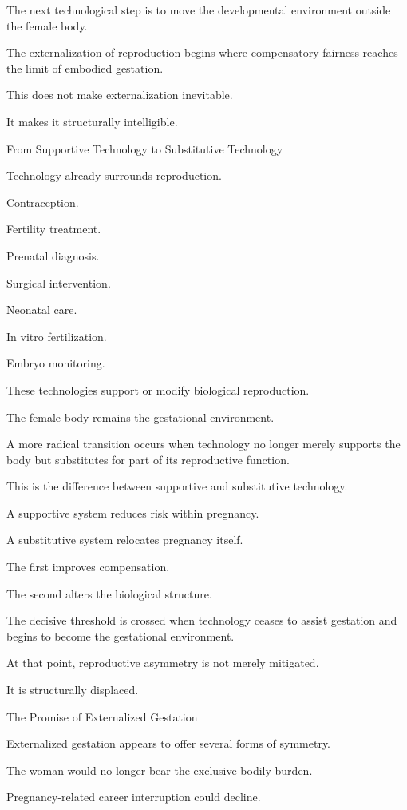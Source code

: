 The next technological step is to move the developmental environment outside the female body.

The externalization of reproduction begins where compensatory fairness reaches the limit of embodied gestation.

This does not make externalization inevitable.

It makes it structurally intelligible.

From Supportive Technology to Substitutive Technology

Technology already surrounds reproduction.

Contraception.

Fertility treatment.

Prenatal diagnosis.

Surgical intervention.

Neonatal care.

In vitro fertilization.

Embryo monitoring.

These technologies support or modify biological reproduction.

The female body remains the gestational environment.

A more radical transition occurs when technology no longer merely supports the body but substitutes for part of its reproductive function.

This is the difference between supportive and substitutive technology.

A supportive system reduces risk within pregnancy.

A substitutive system relocates pregnancy itself.

The first improves compensation.

The second alters the biological structure.

The decisive threshold is crossed when technology ceases to assist gestation and begins to become the gestational environment.

At that point, reproductive asymmetry is not merely mitigated.

It is structurally displaced.

The Promise of Externalized Gestation

Externalized gestation appears to offer several forms of symmetry.

The woman would no longer bear the exclusive bodily burden.

Pregnancy-related career interruption could decline.

